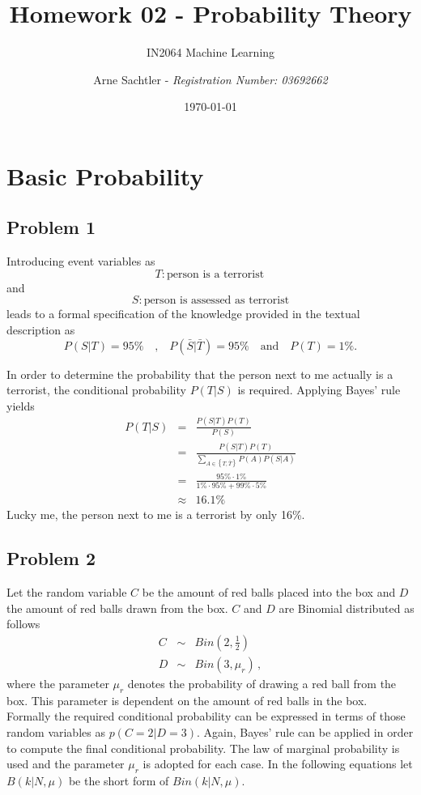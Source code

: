 \documentclass{scrartcl}
\title{Homework 02 - Probability Theory}
\author{Arne Sachtler - \textit{Registration Number: 03692662}}
\date{\today}
\subtitle{IN2064 Machine Learning}
\begin{document}
\maketitle

\section{Basic Probability} %
\label{cha:basic_probability}

\subsection{Problem 1} %
\label{sec:problem_1}

Introducing event variables as
\begin{equation}
	T: \text{person is a terrorist} \, 
\end{equation} and
\begin{equation}
	S: \text{person is assessed as terrorist}
\end{equation}
leads to a formal specification of the knowledge provided in the textual description as
\begin{equation}
	P(S|T) = 95 \% \quad \text{,} \quad P(\bar{S}|\bar{T}) = 95\% \quad \text{and} \quad P(T)=1\%. 
\end{equation}

In order to determine the probability that the person next to me actually is a terrorist, the conditional probability $P(T|S)$ is required. Applying Bayes' rule yields
\begin{eqnarray}
	P(T|S) &=& \frac{P(S|T) P(T)}{P(S)} \\
	&=& \frac{P(S|T) P(T)}{\sum_{A\in \left\{T, \bar{T}\right\}} P(A) P(S|A)}\\
	&=& \frac{95\% \cdot 1\%}{1\% \cdot 95\% + 99\% \cdot 5\%}\\
	&\approx& 16.1\%
\end{eqnarray}
Lucky me, the person next to me is a terrorist by only 16\%.

\subsection{Problem 2} %
\label{sec:problem_2}
Let the random variable $C$ be the amount of red balls placed into the box and $D$ the amount of red balls drawn from the box.
$C$ and $D$ are Binomial distributed as follows
\begin{eqnarray}
C&\sim&Bin\left(2, \frac{1}{2}\right)\\
D&\sim&Bin\left(3, \mu_r\right) \, ,	
\end{eqnarray}
where the parameter $\mu_r$ denotes the probability of drawing a red ball from the box. This parameter is dependent on the amount of red balls in the box.
Formally the required conditional probability can be expressed in terms of those random variables as $p(C=2 | D=3)$.
Again, Bayes' rule can be applied in order to compute the final conditional probability. The law of marginal probability is used and the parameter $\mu_r$ is adopted for each case.
In the following equations let $B(k|N,\mu)$ be the short form of $Bin(k|N,\mu)$.
\end{document}
